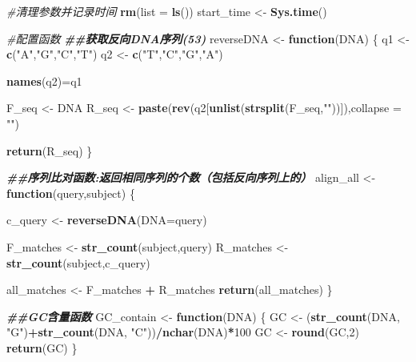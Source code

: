 \documentclass[
]{article}
\newenvironment{Shaded}{\begin{snugshade}}{\end{snugshade}}
\newcommand{\AttributeTok}[1]{\textcolor[rgb]{0.13,0.29,0.53}{#1}}
\newcommand{\CommentTok}[1]{\textcolor[rgb]{0.56,0.35,0.01}{\textit{#1}}}
\newcommand{\ControlFlowTok}[1]{\textcolor[rgb]{0.13,0.29,0.53}{\textbf{#1}}}
\newcommand{\DecValTok}[1]{\textcolor[rgb]{0.00,0.00,0.81}{#1}}
\newcommand{\DocumentationTok}[1]{\textcolor[rgb]{0.56,0.35,0.01}{\textbf{\textit{#1}}}}
\newcommand{\FunctionTok}[1]{\textcolor[rgb]{0.13,0.29,0.53}{\textbf{#1}}}
\newcommand{\NormalTok}[1]{#1}
\newcommand{\OtherTok}[1]{\textcolor[rgb]{0.56,0.35,0.01}{#1}}
\newcommand{\SpecialCharTok}[1]{\textcolor[rgb]{0.81,0.36,0.00}{\textbf{#1}}}
\newcommand{\StringTok}[1]{\textcolor[rgb]{0.31,0.60,0.02}{#1}}
\begin{document}
\begin{Shaded}
\begin{Highlighting}[]
\CommentTok{\#清理参数并记录时间}
\FunctionTok{rm}\NormalTok{(}\AttributeTok{list =} \FunctionTok{ls}\NormalTok{())}
\NormalTok{start\_time }\OtherTok{\textless{}{-}} \FunctionTok{Sys.time}\NormalTok{()}

\CommentTok{\#配置函数}
\DocumentationTok{\#\#获取反向DNA序列(5\textquotesingle{}{-}3\textquotesingle{})}
\NormalTok{reverseDNA }\OtherTok{\textless{}{-}} \ControlFlowTok{function}\NormalTok{(DNA) \{}
\NormalTok{  q1 }\OtherTok{\textless{}{-}} \FunctionTok{c}\NormalTok{(}\StringTok{"A"}\NormalTok{,}\StringTok{"G"}\NormalTok{,}\StringTok{"C"}\NormalTok{,}\StringTok{"T"}\NormalTok{)}
\NormalTok{  q2 }\OtherTok{\textless{}{-}} \FunctionTok{c}\NormalTok{(}\StringTok{"T"}\NormalTok{,}\StringTok{"C"}\NormalTok{,}\StringTok{"G"}\NormalTok{,}\StringTok{"A"}\NormalTok{)}
  
  \FunctionTok{names}\NormalTok{(q2)}\OtherTok{=}\NormalTok{q1}
  
\NormalTok{  F\_seq }\OtherTok{\textless{}{-}}\NormalTok{ DNA}
\NormalTok{  R\_seq }\OtherTok{\textless{}{-}} \FunctionTok{paste}\NormalTok{(}\FunctionTok{rev}\NormalTok{(q2[}\FunctionTok{unlist}\NormalTok{(}\FunctionTok{strsplit}\NormalTok{(F\_seq,}\StringTok{""}\NormalTok{))]),}\AttributeTok{collapse =} \StringTok{""}\NormalTok{)}
  
  \FunctionTok{return}\NormalTok{(R\_seq)}
\NormalTok{\}}

\DocumentationTok{\#\#序列比对函数:返回相同序列的个数（包括反向序列上的）}
\NormalTok{align\_all }\OtherTok{\textless{}{-}} \ControlFlowTok{function}\NormalTok{(query,subject) \{}
  
\NormalTok{  c\_query }\OtherTok{\textless{}{-}} \FunctionTok{reverseDNA}\NormalTok{(}\AttributeTok{DNA=}\NormalTok{query)}
  
\NormalTok{  F\_matches }\OtherTok{\textless{}{-}} \FunctionTok{str\_count}\NormalTok{(subject,query)}
\NormalTok{  R\_matches }\OtherTok{\textless{}{-}} \FunctionTok{str\_count}\NormalTok{(subject,c\_query)}
  
\NormalTok{  all\_matches }\OtherTok{\textless{}{-}}\NormalTok{ F\_matches }\SpecialCharTok{+}\NormalTok{ R\_matches}
  \FunctionTok{return}\NormalTok{(all\_matches)}
\NormalTok{\}}

\DocumentationTok{\#\#GC含量函数}
\NormalTok{GC\_contain }\OtherTok{\textless{}{-}} \ControlFlowTok{function}\NormalTok{(DNA) \{}
\NormalTok{  GC }\OtherTok{\textless{}{-}}\NormalTok{ (}\FunctionTok{str\_count}\NormalTok{(DNA, }\StringTok{"G"}\NormalTok{)}\SpecialCharTok{+}\FunctionTok{str\_count}\NormalTok{(DNA, }\StringTok{"C"}\NormalTok{))}\SpecialCharTok{/}\FunctionTok{nchar}\NormalTok{(DNA)}\SpecialCharTok{*}\DecValTok{100}
\NormalTok{  GC }\OtherTok{\textless{}{-}} \FunctionTok{round}\NormalTok{(GC,}\DecValTok{2}\NormalTok{)}
  \FunctionTok{return}\NormalTok{(GC)}
\NormalTok{\}}


\end{Highlighting}
\end{Shaded}
\end{document}
